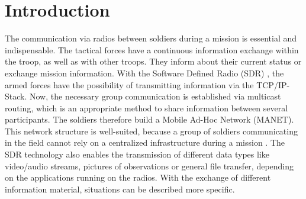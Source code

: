 \documentclass[runningheads]{llncs}
\newcommand{\MANET}{MANET}
\begin{document}
\section{Introduction}\label{sec:Introduction}
%
	The communication via radios between soldiers during a mission is essential and indispensable. The tactical forces have a continuous information exchange within the troop, as well as with other troops. They inform about their current status or exchange mission information. With the Software Defined Radio (SDR) \cite{SDR}, the armed forces have the possibility of transmitting information via the TCP/IP-Stack. Now, the necessary group communication is established via multicast routing, which is an appropriate method to share information between several participants. The soldiers therefore build a Mobile Ad-Hoc Network (\MANET{}). This network structure is well-suited, because a group of soldiers communicating in the field cannot rely on a centralized infrastructure during a mission \cite{military:manet}. The SDR technology also enables the transmission of different data types like video/audio streams, pictures of observations or general file transfer, depending on the  applications running on the radios. With the exchange of different information material, situations can be described more specific.
	
\end{document}
